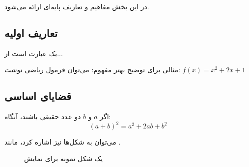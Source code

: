 در این بخش مفاهیم و تعاریف پایه‌ای ارائه می‌شود.

\subsection{تعاریف اولیه}

\begin{definition}
یک  عبارت است از...
\end{definition}

\begin{example}
مثالی برای توضیح بهتر مفهوم:
می‌توان فرمول ریاضی نوشت: $f(x) = x^2 + 2x + 1$
\end{example}

\subsection{قضایای اساسی}

\begin{theorem}
اگر $a$ و $b$ دو عدد حقیقی باشند، آنگاه:
\[
(a + b)^2 = a^2 + 2ab + b^2
\]
\end{theorem}

می‌توان به شکل‌ها نیز اشاره کرد، مانند .

\begin{figure}[h]
\centering
\begin{minipage}{0.6\textwidth}
\centering
{}
\end{minipage}
\caption{یک شکل نمونه برای نمایش}
\label{fig:sample}
\end{figure}

